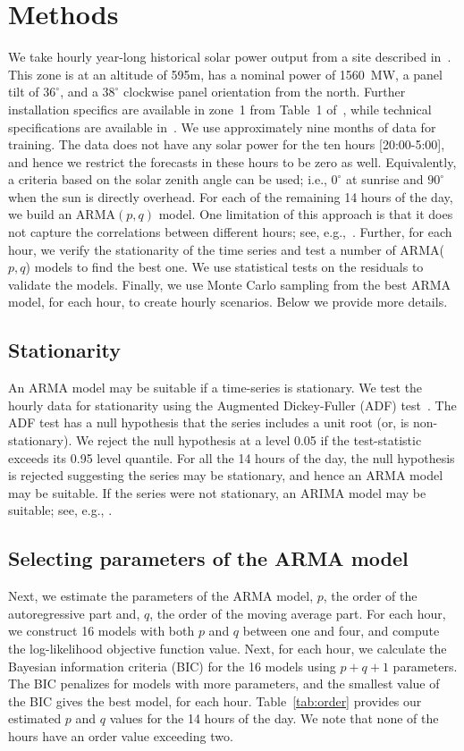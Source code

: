 \documentclass[review]{elsarticle}
\begin{document}
\section{Methods}
We take hourly year-long historical solar power output 
from a site described in~\cite{golestaneh2016generation}. 
This zone is at an altitude of 595m, has a nominal power of 1560~MW, a panel 
tilt 
of $36^\circ$, and a $38^\circ$ clockwise panel orientation from the north. 
Further installation specifics are available in zone~1 from Table~1 
of~\cite{golestaneh2016generation}, while technical specifications are 
available 
in~\cite{technical}.  We use approximately nine months of data 
for training. The data does not have any solar power for the ten hours 
[20:00-5:00], and hence we restrict the forecasts in these hours to be zero as 
well. Equivalently, a criteria based on the solar zenith angle can be used; 
i.e., $0^\circ$ at sunrise and $90^\circ$ when the sun is directly overhead. 
For 
each of the remaining 14 hours of the day, we build an ARMA$(p,q)$ 
model. One limitation of this approach is that it does not capture the 
correlations between different hours; see, e.g.,~\cite{pedro2012assessment}. 
Further, for each hour, we verify the stationarity of the time 
series and test a number of ARMA($p,q$) models to find the best 
one. We use statistical tests on the residuals to validate the models. Finally, 
we use Monte Carlo sampling from the best ARMA model, for each hour, to create 
hourly scenarios. Below we provide more details.

\subsection{Stationarity}
An ARMA model may be suitable if a time-series is stationary. We test 
the hourly data for stationarity using the Augmented 
Dickey-Fuller (ADF) test~\cite{dickey1979distribution}. The ADF test has a null 
hypothesis that the series includes a unit root (or, is non-stationary). We 
reject the null hypothesis at a level 0.05 if the test-statistic exceeds its 
0.95 level quantile. For all the 14 hours of the day, the null hypothesis is 
rejected suggesting the series may be stationary, and hence an ARMA model may 
be suitable. If the series were not stationary, an ARIMA model may be suitable; 
see, e.g., \cite{contreras2003arima}.

\subsection{Selecting parameters of the ARMA model}
Next, we estimate the parameters of the ARMA model, $p$, the order of the 
autoregressive part and, $q$, the order of the moving average part. For each 
hour, we construct 16 models with both $p$ and $q$ between one and four, and 
compute 
the log-likelihood objective function value. Next, for each hour, we calculate 
the Bayesian information criteria (BIC) for the 16 models using $p + q + 1$ 
parameters.  The BIC penalizes for models with more parameters, and the 
smallest value of the BIC gives the best model, for each 
hour. Table~\ref{tab:order} provides our estimated $p$ and $q$  values for 
the 14 hours of the day. We note that none of the hours have an order value 
exceeding two.
\end{document}

